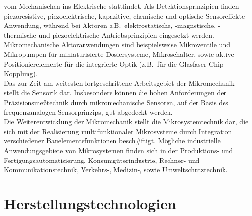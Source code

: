 vom Mechanischen ins Elektrische stattfindet.  Als
Detektionsprinzipien finden piezoresistive, piezoelektrische,
kapazitive, chemische und optische Sensoreffekte Anwendung, während bei
Aktoren z.B.\ elektrostatische, -magnetische, -thermische und
piezoelektrische Antriebsprinzipien eingesetzt werden.  Mikromechanische
Aktoranwendungen sind beispielsweise Mikroventile und Mikropumpen für
miniaturisierte Dosiersysteme, Mikroschalter, sowie aktive
Positionierelemente für die integrierte Optik (z.B.\ für die
Glasfaser-Chip-Kopplung).\\
Das zur Zeit am weitesten fortgeschrittene Arbeitsgebiet der Mikromechanik
stellt die Sensorik dar. Insbesondere können die hohen Anforderungen der
Präzisionsmeßtechnik durch mikromechanische Sensoren, auf der Basis des
frequenzanalogen Sensorprinzips, gut abgedeckt werden.\\
Die Weiterentwicklung der Mikromechanik stellt die Mikrosystemtechnik dar,
die sich mit der Realisierung multifunktionaler Mikrosysteme durch
Integration verschiedener Bauelementefunktionen besch#ftigt. Mögliche
industrielle Anwendungsgebiete von Mikrosystemen finden
sich in der Produktions- und Fertigungsautomatisierung,
Konsumgüterindustrie, Rechner- und Kommunikationstechnik, Verkehrs-,
Medizin-, sowie Umweltschutztechnik.


\section{Herstellungstechnologien}
\label{herstellungstechnologien}

